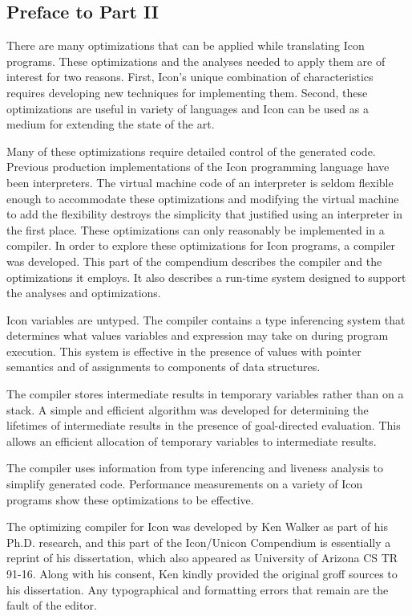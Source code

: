 \subsection*{Preface to Part II}

\bigskip

There are many optimizations that can be applied while translating
Icon programs. These optimizations and the analyses needed to apply
them are of interest for two reasons. First, Icon's unique combination
of characteristics requires developing new techniques for implementing
them. Second, these optimizations are useful in variety of languages
and Icon can be used as a medium for extending the state of the art.

Many of these optimizations require detailed control of the generated
code. Previous production implementations of the Icon programming
language have been interpreters. The virtual machine code of an
interpreter is seldom flexible enough to accommodate these
optimizations and modifying the virtual machine to add the flexibility
destroys the simplicity that justified using an interpreter in the
first place. These optimizations can only reasonably be implemented in
a compiler. In order to explore these optimizations for Icon programs,
a compiler was developed. This part of the compendium describes the
compiler and the optimizations it employs. It also describes a
run-time system designed to support the analyses and optimizations.

Icon variables are untyped. The compiler contains a type inferencing
system that determines what values variables and expression may take
on during program execution. This system is effective in the presence
of values with pointer semantics and of assignments to components of
data structures.

The compiler stores intermediate results in temporary variables rather
than on a stack. A simple and efficient algorithm was developed for
determining the lifetimes of intermediate results in the presence of
goal-directed evaluation. This allows an efficient allocation of
temporary variables to intermediate results.

The compiler uses information from type inferencing and liveness
analysis to simplify generated code. Performance measurements on a
variety of Icon programs show these optimizations to be effective.

The optimizing compiler for Icon was developed by Ken Walker as part
of his Ph.D. research, and this part of the Icon/Unicon Compendium is
essentially a reprint of his dissertation, which also appeared as
University of Arizona CS TR 91-16. Along with his consent, Ken kindly
provided the original groff sources to his dissertation. Any
typographical and formatting errors that remain are the fault of the
editor.
